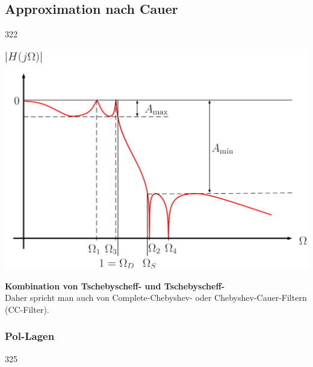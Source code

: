 \subsection{Approximation nach Cauer}{322}

\begin{minipage}[c]{0.45\columnwidth}
    \includegraphics[width=\columnwidth]{images/filter_cauer_amplitudengang.png}
\end{minipage}
\hfill
\begin{minipage}[c]{0.48\columnwidth}
    \textbf{Kombination von Tschebyscheff- und Tschebyscheff-} \\

    Daher spricht man auch von Complete-Chebyshev- oder Chebyshev-Cauer-Filtern (CC-Filter).
\end{minipage}


\subsubsection{Pol-Lagen}{325}

